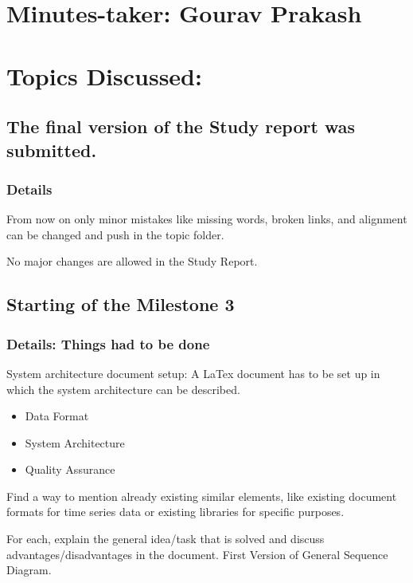 \documentclass[11pt]{meetingmins} %
\begin{document}
\maketitle

\section{Minutes-taker: Gourav Prakash}

\section{Topics Discussed:}

\subsection{The final version of the Study report was submitted.}
\subsubsection{Details}
\begin{hiddensubitems}
    \item
    From now on only minor mistakes like missing words, broken links, and alignment can be changed and push in the topic folder.
    \item No major changes are allowed in the Study Report.
\end{hiddensubitems}

\subsection{Starting of the Milestone 3}
\subsubsection{Details: Things had to be done}

\begin{hiddensubitems}
    \item System architecture document setup: A LaTex document has to be set up in which the system architecture can be described.
    \begin{itemize}
        \item Data Format
        \item System Architecture
        \item Quality Assurance
    \end{itemize}
    \item Find a way to mention already existing similar elements, like existing document formats for time series data or existing libraries for specific purposes.
    \item For each, explain the general idea/task that is solved and discuss advantages/disadvantages in the document. First Version of General Sequence Diagram.
\end{hiddensubitems}
\end{document}
